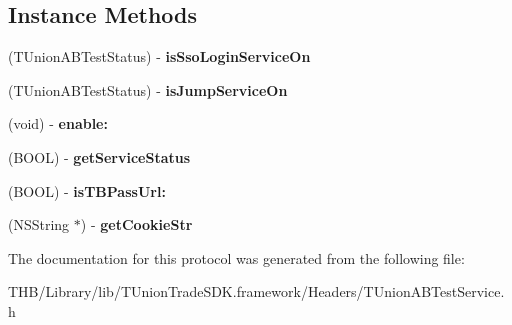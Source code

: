 \subsection*{Instance Methods}
\begin{DoxyCompactItemize}
\item 
\mbox{\label{protocol_t_union_a_b_test_service_01-p_a988f74aad0f53c5eefddb66feffbf95c}} 
(T\+Union\+A\+B\+Test\+Status) -\/ {\bfseries is\+Sso\+Login\+Service\+On}
\item 
\mbox{\label{protocol_t_union_a_b_test_service_01-p_a9833d7d602a1e1e87c3d3b6372e26d28}} 
(T\+Union\+A\+B\+Test\+Status) -\/ {\bfseries is\+Jump\+Service\+On}
\item 
\mbox{\label{protocol_t_union_a_b_test_service_01-p_a5bc6d5ef8c087896a8477af89faa6ab5}} 
(void) -\/ {\bfseries enable\+:}
\item 
\mbox{\label{protocol_t_union_a_b_test_service_01-p_ac78ae9644cc378f407b0b2e3ba6c825f}} 
(B\+O\+OL) -\/ {\bfseries get\+Service\+Status}
\item 
\mbox{\label{protocol_t_union_a_b_test_service_01-p_a6d9e2dba5b6dc1e4f937b1bd93caabb0}} 
(B\+O\+OL) -\/ {\bfseries is\+T\+B\+Pass\+Url\+:}
\item 
\mbox{\label{protocol_t_union_a_b_test_service_01-p_a23e99e07ff56ef38b4c5ddd35491543f}} 
(N\+S\+String $\ast$) -\/ {\bfseries get\+Cookie\+Str}
\end{DoxyCompactItemize}


The documentation for this protocol was generated from the following file\+:\begin{DoxyCompactItemize}
\item 
T\+H\+B/\+Library/lib/\+T\+Union\+Trade\+S\+D\+K.\+framework/\+Headers/T\+Union\+A\+B\+Test\+Service.\+h\end{DoxyCompactItemize}
